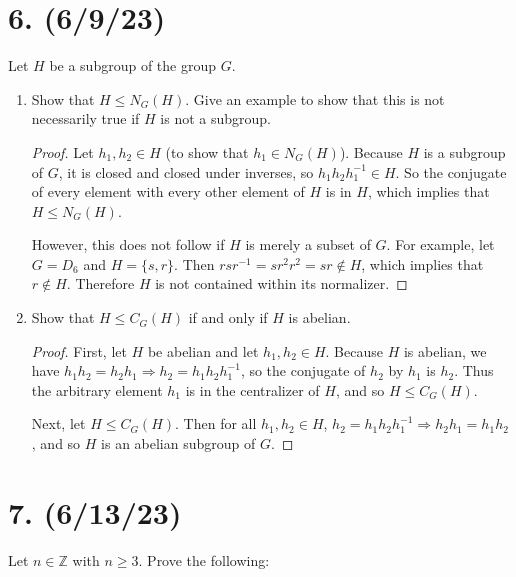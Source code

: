 \documentclass{article}
\begin{document}
\section*{6. (6/9/23)}

Let $H$ be a subgroup of the group $G$.

\begin{enumerate}[label=(\alph*)]
    \item Show that $H \leq N_G(H)$. Give an example to show that this is not necessarily true if $H$ is not a subgroup.
          \begin{proof}
            Let $h_1, h_2 \in H$ (to show that $h_1 \in N_G(H)$). Because $H$ is a subgroup of $G$, it is closed and closed under inverses, so $h_1 h_2 h_1^{-1} \in H$. So the conjugate of every element with every other element of $H$ is in $H$, which implies that $H \leq N_G(H)$.

            However, this does not follow if $H$ is merely a subset of $G$. For example, let $G = D_6$ and $H = \{ s, r \}$. Then $rsr^{-1} = sr^2r^2 = sr \notin H$, which implies that $r \notin H$. Therefore $H$ is not contained within its normalizer.
          \end{proof}
    \item Show that $H \leq C_G(H)$ if and only if $H$ is abelian.
          \begin{proof}
            First, let $H$ be abelian and let $h_1, h_2 \in H$. Because $H$ is abelian, we have $h_1 h_2 = h_2 h_1 \Rightarrow h_2 = h_1 h_2 h_1^{-1}$, so the conjugate of $h_2$ by $h_1$ is $h_2$. Thus the arbitrary element $h_1$ is in the centralizer of $H$, and so $H \leq C_G(H)$.

            Next, let $H \leq C_G(H)$. Then for all $h_1, h_2 \in H$, $h_2 = h_1 h_2 h_1^{-1} \Rightarrow h_2 h_1 = h_1 h_2$, and so $H$ is an abelian subgroup of $G$.
          \end{proof}
\end{enumerate}

\section*{7. (6/13/23)}

Let $n \in \mathbb{Z}$ with $n \geq 3$. Prove the following:
\end{document}
